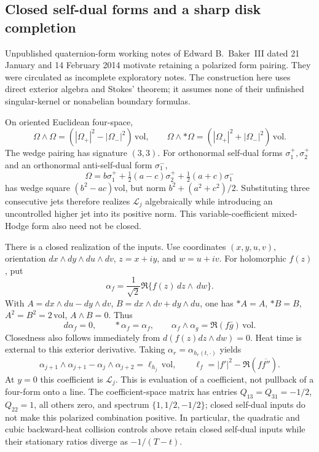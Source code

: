 \documentclass[11pt]{article}
\numberwithin{equation}{section}
\theoremstyle{definition}
\theoremstyle{remark}
\newcommand{\dd}{\,d}
\newcommand{\Lag}{\mathcal L}
\begin{document}
\subsection{Closed self-dual forms and a sharp disk completion}

Unpublished quaternion-form working notes of Edward B.~Baker~III
dated 21 January and 14 February 2014 motivate retaining a polarized
form pairing.  They were circulated as incomplete exploratory notes.
The construction here uses direct exterior algebra and Stokes'
theorem; it assumes none of their unfinished singular-kernel or
nonabelian boundary formulas.

On oriented Euclidean four-space,
\[
 \Omega\wedge\Omega=(|\Omega_+|^2-|\Omega_-|^2)\,\mathrm{vol},
 \qquad
 \Omega\wedge*\Omega=(|\Omega_+|^2+|\Omega_-|^2)\,\mathrm{vol}.
\]
The wedge pairing has signature \((3,3)\).
For orthonormal self-dual forms \(\sigma_1^+,\sigma_2^+\) and an
orthonormal anti-self-dual form \(\sigma_1^-\),
\[
 \Omega=b\sigma_1^++\tfrac12(a-c)\sigma_2^+
                    +\tfrac12(a+c)\sigma_1^-
\]
has wedge square \((b^2-ac)\mathrm{vol}\), but norm
\(b^2+(a^2+c^2)/2\).  Substituting three consecutive jets therefore
realizes \(\Lag_j\) algebraically while introducing an uncontrolled
higher jet into its positive norm.  This variable-coefficient
mixed-Hodge form also need not be closed.

There is a closed realization of the inputs.  Use coordinates
\((x,y,u,v)\), orientation \(dx\wedge dy\wedge du\wedge dv\),
\(z=x+iy\), and \(w=u+iv\).  For holomorphic \(f(z)\), put
\begin{equation}
 \alpha_f=\frac1{\sqrt2}\Re\{f(z)\dd z\wedge\dd w\}.
 \label{sf:alpha}
\end{equation}
With
\(A=dx\wedge du-dy\wedge dv\),
\(B=dx\wedge dv+dy\wedge du\), one has
\(*A=A\), \(*B=B\), \(A^2=B^2=2\,\mathrm{vol}\), \(A\wedge B=0\).
Thus
\begin{equation}
 d\alpha_f=0,\qquad *\alpha_f=\alpha_f,\qquad
 \alpha_f\wedge\alpha_g=\Re(f\bar g)\,\mathrm{vol}.
 \label{sf:closed-pairing}
\end{equation}
Closedness also follows immediately from
\(d(f(z)dz\wedge dw)=0\).  Heat time is external to this exterior
derivative.  Taking \(\alpha_r=\alpha_{h_r(t,\cdot)}\) yields
\[
 \alpha_{j+1}\wedge\alpha_{j+1}-\alpha_j\wedge\alpha_{j+2}
 =\ell_{h_j}\,\mathrm{vol},\qquad
 \ell_f=|f'|^2-\Re(f\overline{f''}).
\]
At \(y=0\) this coefficient is \(\Lag_j\).  This is evaluation of
a coefficient, not pullback of a four-form onto a line.
The coefficient-space matrix has entries
\(Q_{13}=Q_{31}=-1/2\), \(Q_{22}=1\), all others zero, and spectrum
\(\{1,1/2,-1/2\}\); closed self-dual inputs do not make this
polarized combination positive.  In particular, the quadratic and cubic
backward-heat collision controls above retain closed self-dual inputs
while their stationary ratios diverge as \(-1/(T-t)\).
\end{document}
